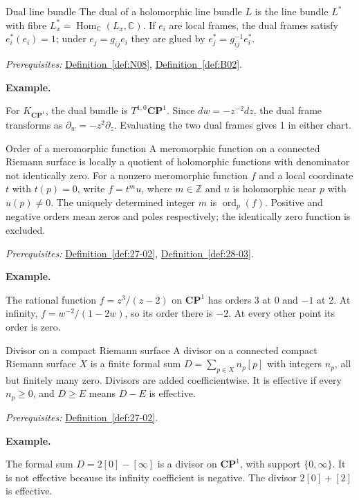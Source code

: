 \documentclass[11pt]{article}
\makeatletter
\newcommand{\C}{\mathbb C}
\newcounter{definition}
\newcommand{\CP}{\mathbf{CP}}
\newcommand{\Z}{\mathbb Z}
\newcommand{\exampleheading}{\par\medskip\textbf{Example.}\par\smallskip}
\newcommand{\currentdefinition}[1]{\protected@edef\@currentlabel{#1}}
\makeatother
\begin{document}
\begin{definitionbox}{Dual line bundle}
\currentdefinition{\thedefinition}
\label{def:N12}
The dual of a holomorphic line bundle $L$ is the line bundle $L^*$ with fibre $L_x^*=\operatorname{Hom}_{\C}(L_x,\C)$. If $e_i$ are local frames, the dual frames satisfy $e_i^*(e_i)=1$; under $e_j=g_{ij}e_i$ they are glued by $e_j^*=g_{ij}^{-1}e_i^*$.

\smallskip
\textit{Prerequisites:} \hyperref[def:N08]{Definition~\ref*{def:N08}}, \hyperref[def:B02]{Definition~\ref*{def:B02}}.

\exampleheading
For $K_{\CP^1}$, the dual bundle is $T^{1,0}\CP^1$. Since $dw=-z^{-2}dz$, the dual frame transforms as $\partial_w=-z^2\partial_z$. Evaluating the two dual frames gives 1 in either chart.
\end{definitionbox}

\begin{definitionbox}{Order of a meromorphic function}
\currentdefinition{\thedefinition}
\label{def:N13}
A meromorphic function on a connected Riemann surface is locally a quotient of holomorphic functions with denominator not identically zero. For a nonzero meromorphic function $f$ and a local coordinate $t$ with $t(p)=0$, write $f=t^m u$, where $m\in\Z$ and $u$ is holomorphic near $p$ with $u(p)\ne0$. The uniquely determined integer $m$ is $\operatorname{ord}_p(f)$. Positive and negative orders mean zeros and poles respectively; the identically zero function is excluded.

\smallskip
\textit{Prerequisites:} \hyperref[def:27-02]{Definition~\ref*{def:27-02}}, \hyperref[def:28-03]{Definition~\ref*{def:28-03}}.

\exampleheading
The rational function $f=z^3/(z-2)$ on $\CP^1$ has orders 3 at 0 and $-1$ at 2. At infinity, $f=w^{-2}/(1-2w)$, so its order there is $-2$. At every other point its order is zero.
\end{definitionbox}

\begin{definitionbox}{Divisor on a compact Riemann surface}
\currentdefinition{\thedefinition}
\label{def:N14}
A divisor on a connected compact Riemann surface $X$ is a finite formal sum $D=\sum_{p\in X}n_p[p]$ with integers $n_p$, all but finitely many zero. Divisors are added coefficientwise. It is effective if every $n_p\ge0$, and $D\ge E$ means $D-E$ is effective.

\smallskip
\textit{Prerequisites:} \hyperref[def:27-02]{Definition~\ref*{def:27-02}}.

\exampleheading
The formal sum $D=2[0]-[\infty]$ is a divisor on $\CP^1$, with support $\{0,\infty\}$. It is not effective because its infinity coefficient is negative. The divisor $2[0]+[2]$ is effective.
\end{definitionbox}
\end{document}
